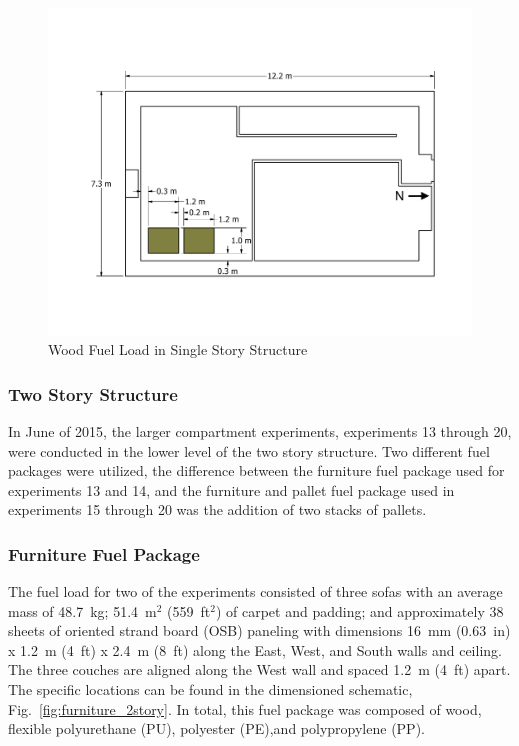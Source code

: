 \documentclass[12pt,oneside]{book}
\begin{document}
\begin{figure}[!ht]
	\includegraphics[width=.8\columnwidth]{../Figures/Floor_Plans/PDFs/East_Structure/DelCo_2012_East_Structure_Pallets}
	\caption{Wood Fuel Load in Single Story Structure}
	\label{fig:Wood_Fuel_Load_Dimensions}
\end{figure}


\subsubsection*{Two Story Structure}
\label{sec:suppresion_two}

In June of 2015, the larger compartment experiments, experiments 13 through 20, were conducted in the lower level of the two story structure.  Two different fuel packages were utilized, the difference between the furniture fuel package used for experiments 13 and 14, and the furniture and pallet fuel package used in experiments 15 through 20 was the addition of two stacks of pallets.   

\subsubsection{Furniture Fuel Package}
\label{sec:fire_suppression_furniture_fuel_2}

The fuel load for two of the experiments consisted of three sofas with an average mass of 48.7~kg; 51.4~m$^2$ (559~ft$^2$) of carpet and padding; and approximately 38 sheets of oriented strand board (OSB) paneling with dimensions 16~mm (0.63~in) x 1.2~m (4~ft) x 2.4~m (8~ft) along the East, West, and South walls and ceiling. The three couches are aligned along the West wall and spaced 1.2~m (4~ft) apart. The specific locations can be found in the dimensioned schematic, Fig.~\ref{fig:furniture_2story}. In total, this fuel package was composed of wood, flexible polyurethane (PU), polyester (PE),and polypropylene (PP).
\end{document}
